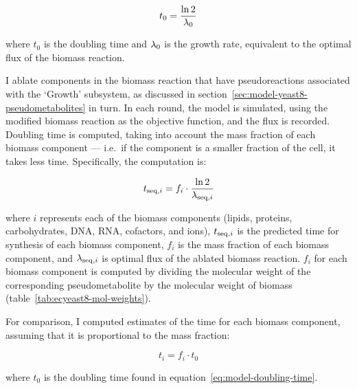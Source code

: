 \begin{equation}
  t_{0} = \frac{\ln 2}{\lambda_{0}}
  \label{eq:model-doubling-time}
\end{equation}

where $t_{0}$ is the doubling time and $\lambda_{0}$ is the growth rate, equivalent to the optimal flux of the biomass reaction.

I ablate components in the biomass reaction that have pseudoreactions associated with the `Growth' subsystem, as discussed in section~\ref{sec:model-yeast8-pseudometabolites} in turn.
In each round, the model is simulated, using the modified biomass reaction as the objective function, and the flux is recorded.
Doubling time is computed, taking into account the mass fraction of each biomass component --- i.e.\ if the component is a smaller fraction of the cell, it takes less time.
Specifically, the computation is:

\begin{equation}
  t_{\mathrm{seq},i} = f_{i} \cdot \frac{\ln 2}{\lambda_{\mathrm{seq},i}}
  \label{eq:model-ablated-time}
\end{equation}

where $i$ represents each of the biomass components (lipids, proteins, carbohydrates, DNA, RNA, cofactors, and ions), $t_{\mathrm{seq},i}$ is the predicted time for synthesis of each biomass component, $f_{i}$ is the mass fraction of each biomass component, and $\lambda_{\mathrm{seq},i}$ is optimal flux of the ablated biomass reaction.
$f_{i}$ for each biomass component is computed by dividing the molecular weight of the corresponding pseudometabolite by the molecular weight of biomass (table~\ref{tab:ecyeast8-mol-weights}).

For comparison, I computed estimates of the time for each biomass component, assuming that it is proportional to the mass fraction:

\begin{equation}
  t_{i} = f_{i} \cdot t_{0}
  \label{eq:model-proportional-time}
\end{equation}

where $t_{0}$ is the doubling time found in equation~\ref{eq:model-doubling-time}.

